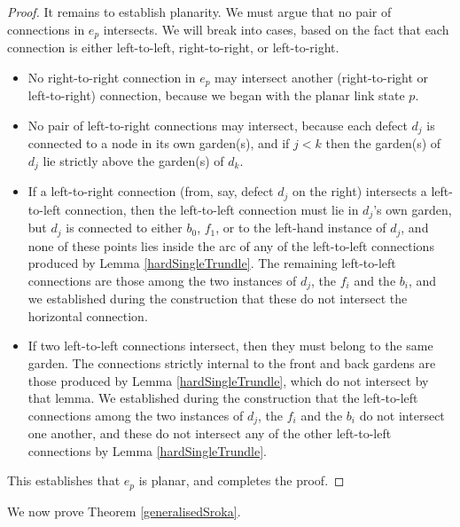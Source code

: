 \documentclass[12pt]{amsart}
\theoremstyle{plain}
\theoremstyle{definition} \newtheorem{definition}[theorem]{Definition}
\theoremstyle{plain}
\theoremstyle{plain} \newtheorem{proposition}[theorem]{Proposition}
\theoremstyle{plain} \newtheorem{conjecture}[theorem]{Conjecture}
\theoremstyle{plain} \newtheorem{corollary}[theorem]{Corollary}
\theoremstyle{remark} \newtheorem{claim}[theorem]{Claim}
\theoremstyle{remark} \newtheorem{remark}[theorem]{Remark}
\theoremstyle{remark} \newtheorem{example}[theorem]{Example}
\theoremstyle{remark} \newtheorem{comment}[theorem]{Comment}
\theoremstyle{definition} \newtheorem{question}[theorem]{Question}
\begin{document}
\begin{proof}
It remains to establish planarity. We must argue that no pair of connections in $e_p$ intersects. We will break into cases, based on the fact that each connection is either left-to-left, right-to-right, or left-to-right.
\begin{itemize}
    \item No right-to-right connection in $e_p$ may intersect another (right-to-right or left-to-right) connection, because we began with the planar link state $p$.
    \item No pair of left-to-right connections may intersect, because each defect $d_j$ is connected to a node in its own garden(s), and if $j<k$ then the garden(s) of $d_j$ lie strictly above the garden(s) of $d_k$.
    \item If a left-to-right connection (from, say, defect $d_j$ on the right) intersects a left-to-left connection, then the left-to-left connection must lie in $d_j$'s own garden, but $d_j$ is connected to either $b_0$, $f_1$, or to the left-hand instance of $d_j$, and none of these points lies inside the arc of any of the left-to-left connections produced by Lemma \ref{hardSingleTrundle}. The remaining left-to-left connections are those among the two instances of $d_j$, the $f_i$ and the $b_i$, and we established during the construction that these do not intersect the horizontal connection.
    \item If two left-to-left connections intersect, then they must belong to the same garden. The connections strictly internal to the front and back gardens are those produced by Lemma \ref{hardSingleTrundle}, which do not intersect by that lemma. We established during the construction that the left-to-left connections among the two instances of $d_j$, the $f_i$ and the $b_i$ do not intersect one another, and these do not intersect any of the other left-to-left connections by Lemma \ref{hardSingleTrundle}.
\end{itemize}

This establishes that $e_p$ is planar, and completes the proof. \end{proof}

We now prove Theorem \ref{generalisedSroka}.
\end{document}
